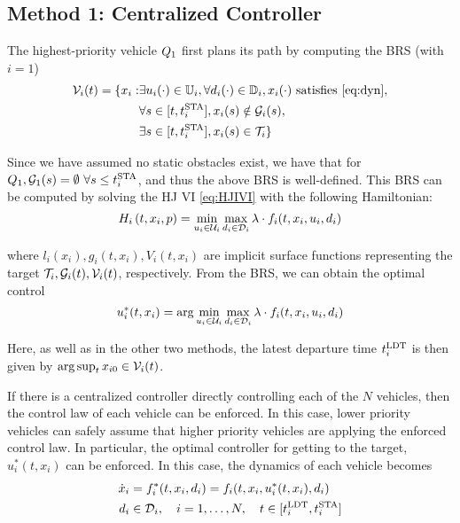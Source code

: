 \subsection{Method 1: Centralized Controller \label{sec:cc}}
The highest-priority vehicle $Q_1$ first plans its path by computing the BRS (with $i=1$)
\vspace{-0.3em}
\begin{equation}
\label{eq:BRS}
\begin{aligned}
\mathcal{V}_i(t) = \{x_i: &\exists u_i(\cdot) \in \mathbb{U}_i, \forall d_i(\cdot) \in \mathbb{D}_i, x_i(\cdot) \text{ satisfies \eqref{eq:dyn}}, \\
&\forall s \in [t, t^\text{STA}_i], x_i(s) \notin \mathcal{G}_i(s), \\
&\exists s \in [t, t^\text{STA}_i], x_i(s) \in \mathcal{T}_i\}
\end{aligned}
\end{equation}

Since we have assumed no static obstacles exist, we have that for $Q_1, \mathcal{G}_1(s)=\emptyset ~ \forall s \le t^\text{STA}_i$, and thus the above BRS is well-defined. This BRS can be computed by solving the HJ VI \eqref{eq:HJIVI} with the following Hamiltonian:
\vspace{-0.3em}
\begin{equation}
H_i\left(t, x_i, p\right) = \min_{u_i \in \mathcal{U}_i} \max_{d_i \in \mathcal{D}_i} \lambda \cdot f_i(t, x_i, u_i, d_i)
\end{equation}

\noindent where $l_i(x_i), g_i(t,x_i),V_i(t,x_i)$ are implicit surface functions representing the target $\mathcal{T}_i, \mathcal{G}_i(t), \mathcal{V}_i(t)$, respectively. From the BRS, we can obtain the optimal control
\vspace{-0.3em}
\begin{equation}
\label{eq:opt_ctrl_i}
u_i^*(t,x_i) =  \arg \min_{u_i \in \mathcal{U}_i} \max_{d_i \in \mathcal{D}_i} \lambda \cdot f_i(t, x_i, u_i, d_i)
\end{equation}

Here, as well as in the other two methods, the latest departure time $t^\text{LDT}_i$ is then given by $\arg \sup_t x_{i0} \in \mathcal{V}_i(t)$.

If there is a centralized controller directly controlling each of the $N$ vehicles, then the control law of each vehicle can be enforced. In this case, lower priority vehicles can safely assume that higher priority vehicles are applying the enforced control law. In particular, the optimal controller for getting to the target, $u^*_i(t, x_i)$ can be enforced. In this case, the dynamics of each vehicle becomes 
\vspace{-0.3em}
\begin{equation}
\label{eq:dyn_cc}
\begin{aligned}
\dot x_i &= f^*_i (t, x_i, d_i) = f_i(t, x_i, u^*_i(t,x_i), d_i) \\
d_i &\in \mathcal{D}_i, \quad i = 1,\ldots, N, \quad t \in [t^\text{LDT}_i, t^\text{STA}_i]
\end{aligned}
\end{equation}

